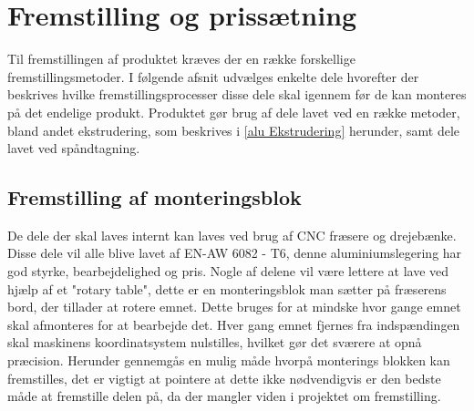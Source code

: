 \section{Fremstilling og prissætning} \label{Fremstillingsmetoder}
Til fremstillingen af produktet kræves der en række forskellige fremstillingsmetoder. I følgende afsnit udvælges enkelte dele hvorefter der beskrives hvilke fremstillingsprocesser disse dele skal igennem før de kan monteres på det endelige produkt. Produktet gør brug af dele lavet ved en række metoder, bland andet ekstrudering, som beskrives i \ref{alu Ekstrudering} herunder, samt dele lavet ved spåndtagning.


\subsection{Fremstilling af monteringsblok} %
De dele der skal laves internt kan laves ved brug af CNC fræsere og drejebænke. Disse dele vil alle blive lavet af EN-AW 6082 - T6, denne aluminiumslegering har god styrke, bearbejdelighed og pris. Nogle af delene vil være lettere at lave ved hjælp af et "rotary table", dette er en monteringsblok man sætter på fræserens bord, der tillader at rotere emnet. Dette bruges for at mindske hvor gange emnet skal afmonteres for at bearbejde det. Hver gang emnet fjernes fra indspændingen skal maskinens koordinatsystem nulstilles, hvilket gør det sværere at opnå præcision. Herunder gennemgås en mulig måde hvorpå monterings blokken kan fremstilles, det er vigtigt at pointere at dette ikke nødvendigvis er den bedste måde at fremstille delen på, da der mangler viden i projektet om fremstilling. 

